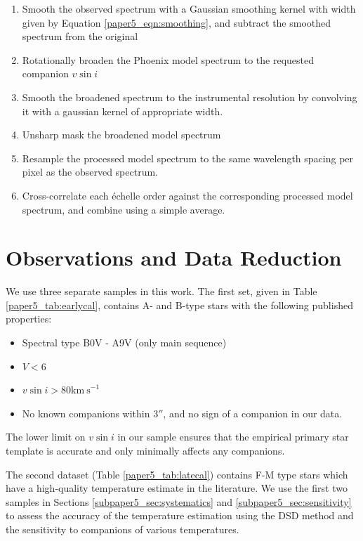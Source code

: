 \begin{enumerate}
 \item Smooth the observed spectrum with a Gaussian smoothing kernel with width given by Equation \ref{paper5_eqn:smoothing}, and subtract the smoothed spectrum from the original
 \item Rotationally broaden the Phoenix model spectrum to the requested companion $v\sin{i}$
 \item Smooth the broadened spectrum to the instrumental resolution by convolving it with a gaussian kernel of appropriate width.
 \item Unsharp mask the broadened model spectrum
 \item Resample the processed model spectrum to the same wavelength spacing per pixel as the observed spectrum.
 \item Cross-correlate each \'echelle order against the corresponding processed model spectrum, and combine using a simple average.
\end{enumerate}




\section{Observations and Data Reduction}
\label{paper5_sec:obs}
We use three separate samples in this work. The first set, given in Table \ref{paper5_tab:earlycal}, contains  A- and B-type stars with the following published properties:

\begin{itemize}
\item Spectral type B0V - A9V (only main sequence)
\item $V < 6$
\item $v\sin{i} > 80 \mathrm{km\ s}^{-1}$
\item No known companions within $3 ''$, and no sign of a companion in our data.
\end{itemize}
The lower limit on $v\sin{i}$ in our sample ensures that the empirical primary star template is accurate and only minimally affects any companions.

The second dataset (Table \ref{paper5_tab:latecal}) contains F-M type stars which have a high-quality temperature estimate in the literature. We use the first two samples in Sections \ref{subpaper5_sec:systematics} and \ref{subpaper5_sec:sensitivity} to assess the accuracy of the temperature estimation using the DSD method and the sensitivity to companions of various temperatures.

